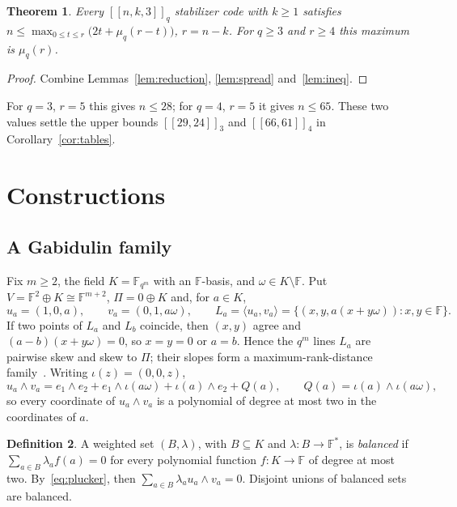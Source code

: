 \documentclass[11pt]{amsart}
\newtheorem{theorem}{Theorem}[section]
\theoremstyle{definition}
\newtheorem{definition}[theorem]{Definition}
\theoremstyle{remark}
\newcommand{\F}{\mathbb F}
\newcommand{\qq}[1]{[\![#1]\!]}
\begin{document}
\begin{theorem}\label{thm:upper}
Every $\qq{n,k,3}_q$ stabilizer code with $k\ge1$ satisfies $n\le\max_{0\le t\le r}\bigl(2t+\mu_q(r-t)\bigr)$, $r=n-k$. For $q\ge3$ and $r\ge4$ this maximum is $\mu_q(r)$.
\end{theorem}

\begin{proof}
Combine Lemmas~\ref{lem:reduction}, \ref{lem:spread} and~\ref{lem:ineq}.
\end{proof}

For $q=3$, $r=5$ this gives $n\le28$; for $q=4$, $r=5$ it gives $n\le65$. These two values settle the upper bounds $\qq{29,24}_3$ and $\qq{66,61}_4$ in Corollary~\ref{cor:tables}.

\section{Constructions}\label{sec:constructions}

\subsection{A Gabidulin family}
Fix $m\ge2$, the field $K=\F_{q^m}$ with an $\F$-basis, and $\omega\in K\setminus\F$. Put $V=\F^2\oplus K\cong\F^{m+2}$, $\Pi=0\oplus K$ and, for $a\in K$,
\[
u_a=(1,0,a),\qquad v_a=(0,1,a\omega),\qquad L_a=\langle u_a,v_a\rangle=\{(x,y,a(x+y\omega)):x,y\in\F\}.
\]
If two points of $L_a$ and $L_b$ coincide, then $(x,y)$ agree and $(a-b)(x+y\omega)=0$, so $x=y=0$ or $a=b$. Hence the $q^m$ lines $L_a$ are pairwise skew and skew to $\Pi$; their slopes form a maximum-rank-distance family~\cite{Delsarte1978,Gabidulin1985}. Writing $\iota(z)=(0,0,z)$,
\begin{equation}\label{eq:plucker}
u_a\wedge v_a=e_1\wedge e_2+e_1\wedge\iota(a\omega)+\iota(a)\wedge e_2+Q(a),\qquad Q(a)=\iota(a)\wedge\iota(a\omega),
\end{equation}
so every coordinate of $u_a\wedge v_a$ is a polynomial of degree at most two in the coordinates of $a$.

\begin{definition}
A weighted set $(B,\lambda)$, with $B\subseteq K$ and $\lambda:B\to\F^\ast$, is \emph{balanced} if $\sum_{a\in B}\lambda_af(a)=0$ for every polynomial function $f:K\to\F$ of degree at most two. By~\eqref{eq:plucker}, then $\sum_{a\in B}\lambda_au_a\wedge v_a=0$. Disjoint unions of balanced sets are balanced.
\end{definition}
\end{document}
